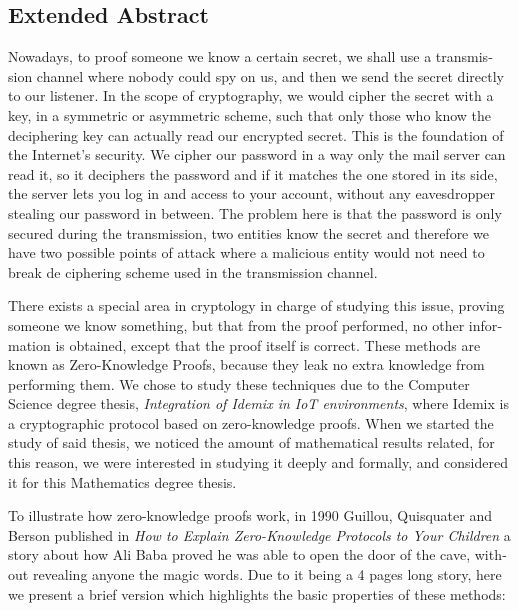 
\begingroup
\let\clearpage\relax
\let\cleardoublepage\relax
\let\cleardoublepage\relax

\begin{otherlanguage}{english}
\chapter*{Extended Abstract}

Nowadays, to proof someone we know a certain secret, we shall use a transmission channel where nobody could spy on us, and then we send the secret directly to our listener. In the scope of cryptography, we would cipher the secret with a key, in a symmetric or asymmetric scheme, such that only those who know the deciphering key can actually read our encrypted secret. This is the foundation of the Internet's security. We cipher our password in a way only the mail server can read it, so it deciphers the password and if it matches the one stored in its side, the server lets you log in and access to your account, without any eavesdropper stealing our password in between. The problem here is that the password is only secured during the transmission, two entities know the secret and therefore we have two possible points of attack where a malicious entity would not need to break de ciphering scheme used in the transmission channel.

There exists a special area in cryptology in charge of studying this issue, proving someone we know something, but that from the proof performed, no other information is obtained, except that the proof itself is correct. These methods are known as Zero-Knowledge Proofs, because they leak no extra knowledge from performing them.
We chose to study these techniques due to the Computer Science degree thesis, \textit{Integration of Idemix in IoT environments}, where Idemix is a cryptographic protocol based on zero-knowledge proofs. When we started the study of said thesis, we noticed the amount of mathematical results related, for this reason, we were interested in studying it deeply and formally, and considered it for this Mathematics degree thesis.

To illustrate how zero-knowledge proofs work, in 1990 Guillou, Quisquater and Berson published in \textit{How to Explain Zero-Knowledge Protocols to Your Children} \citep{ZKPcave:story} a story about how Ali Baba proved he was able to open the door of the cave, without revealing anyone the magic words. Due to it being a 4 pages long story, here we present a brief version which highlights the basic properties of these methods:


\end{otherlanguage}
